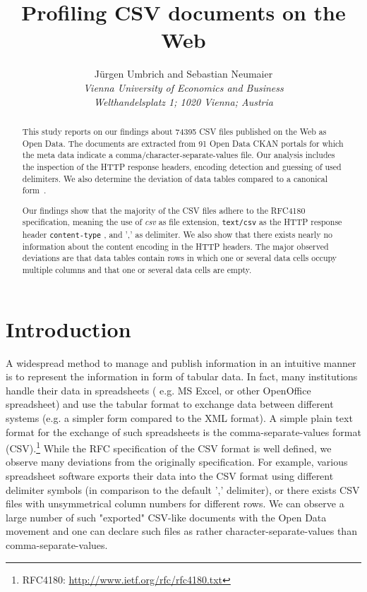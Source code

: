 \documentclass{scrartcl}
\title{Profiling CSV documents on the Web}
\subtitle{}
\author{J\"urgen Umbrich and Sebastian Neumaier\\\textit{Vienna University of Economics and Business}\\ \textit{Welthandelsplatz 1; 1020 Vienna; Austria}}
\date{}
\begin{document}
\maketitle
\begin{abstract}
This study reports on our findings about 74395 CSV files published on the Web as Open Data.
The documents are extracted from 91 Open Data CKAN portals for which the meta data indicate a comma/character-separate-values file.
Our analysis includes the inspection of the HTTP response headers, encoding detection and guessing of used delimiters. 
We also determine the deviation of data tables compared to a canonical form~\cite{ermilov:2013aa}.

Our findings show that the majority of the CSV files adhere to the RFC4180 specification, meaning the use of \textit{csv} as file extension, \texttt{text/csv} as the HTTP response header \texttt{content-type} , and ',' as delimiter.
We also show that there exists nearly no information about the content encoding in the HTTP headers.
The major observed deviations are that data tables contain rows in which one or several data cells occupy multiple columns and that one or several data cells are empty.

\end{abstract}
\newpage

\tableofcontents
\newpage
\section{Introduction}
A widespread method to manage and publish information in an intuitive manner is to represent the information in form of tabular data.
In fact, many institutions handle their data in spreadsheets ( e.g. MS Excel, or other OpenOffice spreadsheet) and use the tabular format to exchange data between different systems (e.g. a simpler form compared to the XML format).
A simple plain text format for the exchange of such spreadsheets is the comma-separate-values format (CSV).\footnote{RFC4180: \url{http://www.ietf.org/rfc/rfc4180.txt}} 
While the RFC specification of the CSV format is well defined,
we observe many deviations from the originally specification. 
For example, various spreadsheet software exports their data into the CSV format using different delimiter symbols (in comparison to the default ',' delimiter), or there exists CSV files with unsymmetrical column numbers for different rows. 
We can observe a large number of such "exported" CSV-like documents with the Open Data movement and one can declare such files as rather character-separate-values than comma-separate-values.
\end{document}
